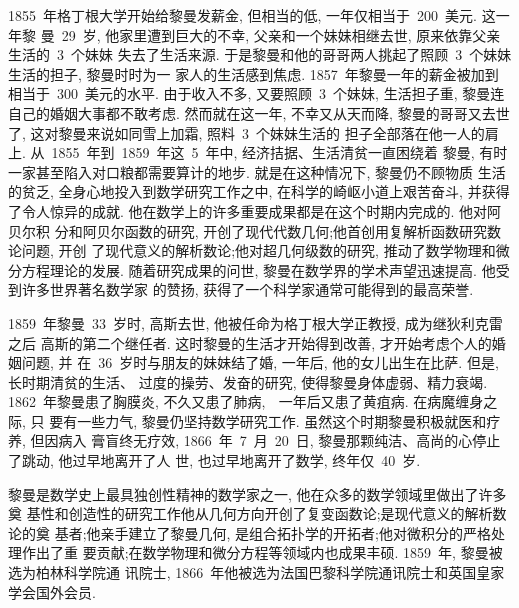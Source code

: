 1855~年格丁根大学开始给黎曼发薪金, 但相当的低, 一年仅相当于~200~美元. 这一年黎
曼~29~岁, 他家里遭到巨大的不幸, 父亲和一个妹妹相继去世, 原来依靠父亲生活的~3~个妹妹
失去了生活来源. 于是黎曼和他的哥哥两人挑起了照顾~3~个妹妹生活的担子, 黎曼时时为一
家人的生活感到焦虑. 1857~年黎曼一年的薪金被加到相当于~300~美元的水平. 由于收入不多, 又要照顾~3~个妹妹, 生活担子重, 黎曼连自己的婚姻大事都不敢考虑. 然而就在这一年, 不幸又从天而降, 黎曼的哥哥又去世了, 这对黎曼来说如同雪上加霜, 照料~3~个妹妹生活的
担子全部落在他一人的肩上. 从~1855~年到~1859~年这~5~年中, 经济拮据、生活清贫一直困绕着
黎曼, 有时一家甚至陷入对口粮都需要算计的地步. 就是在这种情况下, 黎曼仍不顾物质
生活的贫乏, 全身心地投入到数学研究工作之中, 在科学的崎岖小道上艰苦奋斗, 并获得
了令人惊异的成就. 他在数学上的许多重要成果都是在这个时期内完成的. 他对阿贝尔积
分和阿贝尔函数的研究, 开创了现代代数几何;他首创用复解析函数研究数论问题, 开创
了现代意义的解析数论;他对超几何级数的研究, 推动了数学物理和微分方程理论的发展. 随着研究成果的问世, 黎曼在数学界的学术声望迅速提高. 他受到许多世界著名数学家
的赞扬, 获得了一个科学家通常可能得到的最高荣誉.

1859~年黎曼~33~岁时, 高斯去世, 他被任命为格丁根大学正教授, 成为继狄利克雷之后
高斯的第二个继任者. 这时黎曼的生活才开始得到改善, 才开始考虑个人的婚姻问题, 并
在~36~岁时与朋友的妹妹结了婚, 一年后, 他的女儿出生在比萨. 但是, 长时期清贫的生活、
过度的操劳、发奋的研究, 使得黎曼身体虚弱、精力衰竭. 1862~年黎曼患了胸膜炎, 不久又患了肺病, 
一年后又患了黄疽病. 在病魔缠身之际, 只
要有一些力气, 黎曼仍坚持数学研究工作. 虽然这个时期黎曼积极就医和疗养, 但因病入
膏盲终无疗效, 1866~年~7~月~20~日, 黎曼那颗纯洁、高尚的心停止了跳动, 他过早地离开了人
世, 也过早地离开了数学, 终年仅~40~岁.

黎曼是数学史上最具独创性精神的数学家之一, 他在众多的数学领域里做出了许多奠
基性和创造性的研究工作\raisebox{0.5mm}{-----}他从几何方向开创了复变函数论;是现代意义的解析数论的奠
基者;他亲手建立了黎曼几何, 是组合拓扑学的开拓者;他对微积分的严格处理作出了重
要贡献;在数学物理和微分方程等领域内也成果丰硕. 1859~年, 黎曼被选为柏林科学院通
讯院士, 1866~年他被选为法国巴黎科学院通讯院士和英国皇家学会国外会员.

